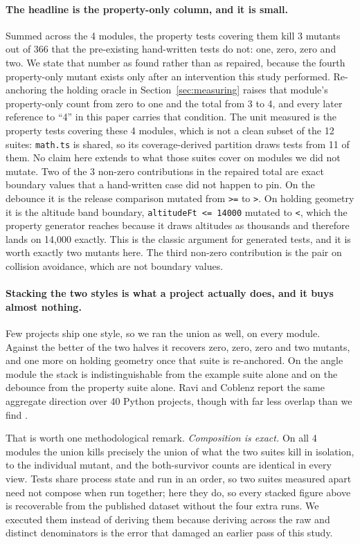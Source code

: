 \documentclass[12pt]{article}
\begin{document}
\paragraph{The headline is the property-only column, and it is small.} Summed across
the 4 modules, the property tests covering them kill 3 mutants out of 366
that the pre-existing hand-written tests do not: one, zero, zero and two. We state
that number as found rather than as repaired, because the fourth property-only mutant
exists only after an intervention this study performed. Re-anchoring the holding
oracle in Section~\ref{sec:measuring} raises that module's property-only count
from zero to one and the total from 3 to 4, and every later reference to
``4'' in this paper carries that condition. The unit measured is the property
tests covering these 4 modules, which is not a clean subset of the 12 suites:
\texttt{math.ts} is shared, so its coverage-derived partition draws tests from 11
of them. No claim here extends to what those suites cover on modules we did not
mutate. Two of the 3 non-zero
contributions in the repaired total are exact boundary values that a hand-written
case did not happen to pin. On the debounce it is the release comparison mutated
from \texttt{>=} to \texttt{>}. On holding geometry it is the altitude band
boundary, \texttt{altitudeFt <= 14000} mutated to \texttt{<}, which the property
generator reaches because it draws altitudes as thousands and therefore lands on
14{,}000 exactly. This is the classic argument for generated tests, and it is
worth exactly two mutants here. The third non-zero contribution is the pair on
collision avoidance, which are not boundary values.

\paragraph{Stacking the two styles is what a project actually does, and it buys
almost nothing.} Few projects ship one style, so we ran the union as well, on every
module. Against the better of the two halves it recovers zero, zero, zero and two
mutants, and one more on holding geometry once that suite is re-anchored. On the
angle module the stack is indistinguishable from the example suite alone and on the
debounce from the property suite alone. Ravi and Coblenz report the same aggregate
direction over 40 Python projects, though with far less overlap than we find
\cite{ravi2025}.

That is worth one methodological remark. \emph{Composition is exact.} On all 4
modules the union kills precisely the union of what the two suites kill in
isolation, to the individual mutant, and the both-survivor counts are identical in
every view. Tests share process state and run in an order, so two suites measured
apart need not compose when run together; here they do, so every stacked figure
above is recoverable from the published dataset without the four extra runs. We executed them instead of deriving them because deriving across the raw and distinct
denominators is the error that damaged an earlier pass of this study.
\end{document}
